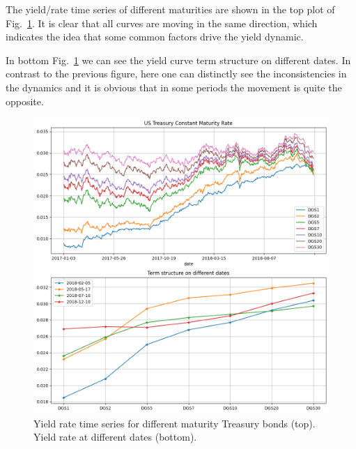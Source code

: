 The yield/rate time series of different maturities are shown in the top plot of Fig.~\ref{fig:yield_rate_ts}. It is clear that all curves are moving in the same direction, which indicates the idea that some common factors drive the yield dynamic.

In bottom Fig.~\ref{fig:yield_rate_ts} we can see the yield curve term structure on different dates. In contrast to the previous figure, here one can distinctly see the inconsistencies in the dynamics and it is obvious that in some periods the movement is quite the opposite.

\begin{figure}[htbp]
	\centering
	\includegraphics[width=0.7\linewidth]{figures/treasury_rate}
	\caption{Yield rate time series for different maturity Treasury bonds (top). Yield rate at different dates (bottom).}
	\label{fig:yield_rate_ts}
\end{figure}

